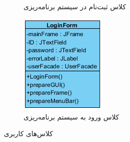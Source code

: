 \begin{figure}[H]
\begin{subfigure}[b]{0.3\textwidth}
		\caption{کلاس ثبت‌نام در سیستم برنامه‌ریزی}
	\end{subfigure}
	\begin{subfigure}[b]{0.3\textwidth}
		\includegraphics[width=\textwidth]{img/class-design/ui/LoginForm.png}
		\caption{کلاس ورود به سیستم برنامه‌ریزی}
	\end{subfigure}
	\caption{کلاس‌های کاربری}
\end{figure}

